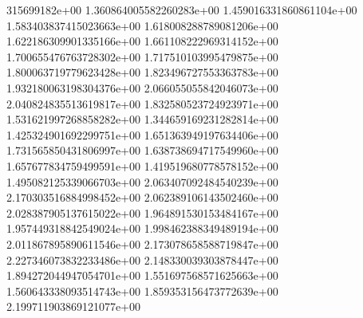 315699182e+00	1.360864005582260283e+00	1.459016331860861104e+00	1.583403837415023663e+00	1.618008288789081206e+00	1.622186309901335166e+00	1.661108222969314152e+00	1.700655476763728302e+00	1.717510103995479875e+00	1.800063719779623428e+00	1.823496727553363783e+00	1.932180063198304376e+00	2.066055055842046073e+00	2.040824835513619817e+00	1.832580523724923971e+00	1.531621997268858282e+00	1.344659169231282814e+00	1.425324901692299751e+00	1.651363949197634406e+00	1.731565850431806997e+00	1.638738694717549960e+00	1.657677834759499591e+00	1.419519680778578152e+00	1.495082125339066703e+00	2.063407092484540239e+00	2.170303516884998452e+00	2.062389106143502460e+00	2.028387905137615022e+00	1.964891530153484167e+00	1.957449318842549024e+00	1.998462388349489194e+00	2.011867895890611546e+00	2.173078658588719847e+00	2.227346073832233486e+00	2.148330039303878447e+00	1.894272044947054701e+00	1.551697568571625663e+00	1.560643338093514743e+00	1.859353156473772639e+00	2.199711903869121077e+00
